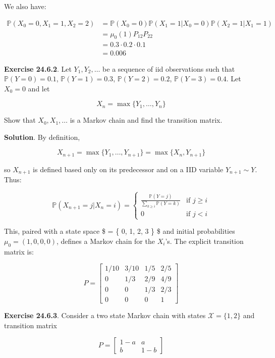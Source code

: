 We also have:

\[
\begin{align}
\mathbb{P}(X_0 = 0, X_1 = 1, X_2 = 2) &= \mathbb{P}(X_0 = 0) \mathbb{P}(X_1 = 1 | X_0 = 0) \mathbb{P}(X_2 = 1 | X_1 = 1) \\
&= \mu_0(1) P_{12} P_{22} \\
& = 0.3 \cdot 0.2 \cdot 0.1 \\
& = 0.006
\end{align}
\]

\textbf{Exercise 24.6.2}. Let \(Y_1, Y_2, \dots\) be a sequence of iid
observations such that \(\mathbb{P}(Y = 0) = 0.1\),
\(\mathbb{P}(Y = 1) = 0.3\), \(\mathbb{P}(Y = 2) = 0.2\),
\(\mathbb{P}(Y = 3) = 0.4\). Let \(X_0 = 0\) and let

\[ X_n = \max \{ Y_1, \dots, Y_n \} \]

Show that \(X_0, X_1, \dots\) is a Markov chain and find the transition
matrix.

\textbf{Solution}. By definition,

\[ X_{n + 1} = \max \{Y_1, \dots, Y_{n+1} \} = \max \{ X_n, Y_{n + 1} \} \]

so \(X_{n + 1}\) is defined based only on its predecessor and on a IID
variable \(Y_{n+1} \sim Y\). Thus:

\[ \mathbb{P}(X_{n + 1} = j | X_n = i) = \begin{cases}
\frac{\mathbb{P}(Y = j)}{\sum_{k \geq i} \mathbb{P}(Y = k)} & \text{if } j \geq i \\
0 &\text{if } j < i
\end{cases} \]

This, paired with a state space \$ = \{ 0, 1, 2, 3 \} \$ and
initial probabilities \(\mu_0 = (1, 0, 0, 0)\), defines a Markov chain
for the \(X_i\)'s. The explicit transition matrix is:

\[ P = \begin{bmatrix}
1/10 & 3/10 & 1/5 & 2/5 \\
0   & 1/3 & 2/9 & 4/9 \\
0   & 0   & 1/3 & 2/3 \\
0   & 0   & 0   & 1
\end{bmatrix}\]

\textbf{Exercise 24.6.3}. Consider a two state Markov chain with states
\(\mathcal{X} = \{ 1, 2 \}\) and transition matrix

\[ P = \begin{bmatrix}
1 - a & a \\
b & 1 - b
\end{bmatrix} \]

